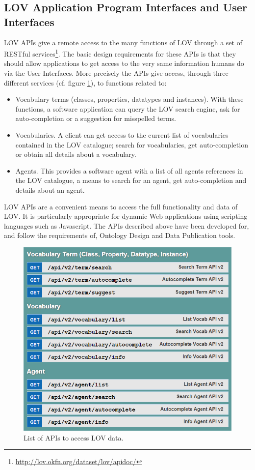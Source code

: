 \documentclass{iosart2c}
\begin{document}
\subsection{LOV Application Program Interfaces and User Interfaces}
LOV APIs give a remote access to the many functions of LOV through a set of RESTful services\footnote{\url{http://lov.okfn.org/dataset/lov/apidoc/}}. The basic design requirements for these APIs is that they should allow applications to get access to the very same information humans do via the User Interfaces. More precisely the APIs give access, through three different services (cf. figure \ref{fig:apis}), to functions related to:
\begin{itemize} 
			\item Vocabulary terms (classes, properties, datatypes and instances). With these functions, a software application can query the LOV search engine, ask for auto-completion or a suggestion for misspelled terms.
			\item Vocabularies. A client can get access to the current list of vocabularies contained in the LOV catalogue; search for vocabularies, get auto-completion or obtain all details about a vocabulary.
			\item Agents. This provides a software agent with a list of all agents references in the LOV catalogue, a means to search for an agent, get auto-completion and details about an agent.
		\end{itemize}
LOV APIs are a convenient means to access the full functionality and data of LOV. It is particularly appropriate for dynamic Web applications using scripting languages such as Javascript. The APIs described above have been developed for, and follow the requirements of, Ontology Design and Data Publication tools.

\begin{figure}[ht!b]
\includegraphics[scale=0.4]{apis.png}
\caption{List of APIs to access LOV data.}
\label{fig:apis}
\end{figure}
\end{document}
